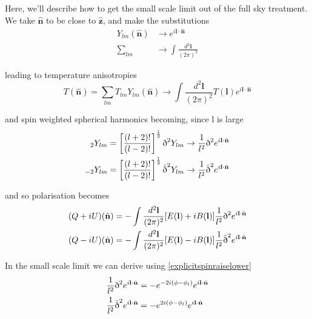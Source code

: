 \documentclass[a4paper,10pt]{article}
\renewcommand{\v}[1]{\mathbf{#1}}
\newcommand{\half}{\frac{1}{2}}
\newcommand{\finttwo}[1]{\int \frac{d^2 \v{#1}}{(2\pi)^2}}
\newcommand{\unit}[1]{\hat{\v{#1}}}
\newcommand{\sr}{\text{\normalfont\dh}}
\renewcommand{\sl}{\bar{\text{\normalfont\dh}}}
\newcommand{\ltwo}{\left[\frac{(l+2)!}{(l-2)!}\right]}
\begin{document}
Here, we'll describe how to get the small scale limit out of the full sky treatment.  We take $\unit{n}$ to be close to $\unit{z}$, and make the substitutions
\begin{equation}
\begin{split}
Y_{lm}(\unit{n}) &\rightarrow e^{i\v{l}\cdot\unit{n}}\\
\sum_{lm} &\rightarrow \finttwo{l}
\end{split}
\end{equation}

leading to temperature anisotropies
\begin{equation}
T(\unit{n}) = \sum_{lm} T_{lm}Y_{lm}(\unit{n})\rightarrow \finttwo{l} T(\v{l})e^{i\v{l}\cdot\unit{n}}
\end{equation}

and spin weighted spherical harmonics becoming, since l is large 
\begin{equation}\begin{split}
{}_2Y_{lm} &= \ltwo^\half\sr^2Y_{lm} \rightarrow \frac{1}{l^2}\sr^2e^{i\v{l}\cdot\unit{n}}\\
{}_{-2}Y_{lm} &= \ltwo^\half\sl^2Y_{lm} \rightarrow  \frac{1}{l^2}\sl^2e^{i\v{l}\cdot\unit{n}}
\end{split}\end{equation}

and so polarisation becomes
\begin{equation}\begin{split}
(Q+iU)(\unit{n}) &= -\finttwo{l} [E(\v{l})+iB(\v{l})]  \frac{1}{l^2}\sr^2e^{i\v{l}\cdot\unit{n}}\\
(Q-iU)(\unit{n}) &= -\finttwo{l} [E(\v{l})-iB(\v{l})] \frac{1}{l^2}\sl^2e^{i\v{l}\cdot\unit{n}}
\end{split}\end{equation}

In the small scale limit we can derive using \ref{explicitspinraiselower}
\begin{equation}\begin{split}
\frac{1}{l^2}\sr^2e^{i\v{l}\cdot\unit{n}} &= -e^{-2i(\phi-\phi_l)}e^{i\v{l}\cdot\unit{n}}\\
\frac{1}{l^2}\sl^2e^{i\v{l}\cdot\unit{n}} &= -e^{2i(\phi-\phi_l)}e^{i\v{l}\cdot\unit{n}}
\end{split}\end{equation}
\end{document}
